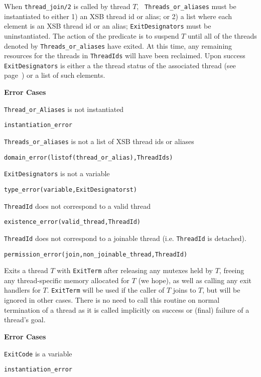 \begin{description}
% 
When {\tt thread\_join/2} is called by thread $T$, {\tt
  Threads\_or\_aliases} must be instantiated to either 1) an XSB
thread id or alias; or 2) a list where each element is an XSB thread
id or an alias; {\tt ExitDesignators} must be uninstantiated.  The
action of the predicate is to suspend $T$ until all of the threads
denoted by {\tt Threads\_or\_aliases} have exited.  At this time, any
remaining resources for the threads in {\tt ThreadIds} will have been
reclaimed.  Upon success {\tt ExitDesignators} is either a the thread
status of the associated thread (see page~\pageref{page:thread-status}) 
or a list of such elements.  

{\bf Error Cases}
\bi
\item 	{\tt Thread\_or\_Aliases} is not instantiated
\bi
\item 	{\tt instantiation\_error}
\ei
%
\item 	{\tt Threads\_or\_aliases} is not a list of XSB thread ids or aliases
\bi
\item 	{\tt domain\_error(listof(thread\_or\_alias),ThreadIds)}
\ei
%
\item 	{\tt ExitDesignators} is not a variable
\bi
\item 	{\tt type\_error(variable,ExitDesignatorst)}
\ei
%
\item   {\tt ThreadId} does not correspond to a valid thread
\bi
\item   {\tt existence\_error(valid\_thread,ThreadId)}
\ei
\item   {\tt ThreadId} does not correspond to a joinable thread
  (i.e. {\tt ThreadId} is detached).
\bi
\item   {\tt permission\_error(join,non\_joinable\_thread,ThreadId)}
\ei
\ei


%
Exits a thread $T$ with {\tt ExitTerm} after releasing any mutexes
held by $T$, freeing any thread-specific memory allocated for $T$ (we
hope), as well as calling any exit handlers for $T$.  {\tt ExitTerm}
will be used if the caller of $T$ joins to $T$, but will be ignored in
other cases.  There is no need to call this routine on normal
termination of a thread as it is called implicitly on success or
(final) failure of a thread's goal.

{\bf Error Cases}
\bi
\item 	{\tt ExitCode} is a variable
\bi
\item 	{\tt instantiation\_error}
\ei
\ei


\end{description}
